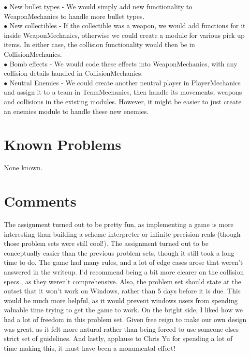 \documentclass{article}
\begin{document}
$\bullet$ New bullet types - We would simply add new functionality to WeaponMechanics to handle more bullet types.  \\
$\bullet$ New collectibles - If the collectible was a weapon, we would add functions for it inside WeaponMechanics, otherwise we could
create a module for various pick up items. In either case, the collision functionality would then be in CollisionMechanics. \\
$\bullet$ Bomb effects - We would code these effects into WeaponMechanics, with any collision details handled in CollisionMechanics. \\
$\bullet$ Neutral Enemies - We could create another neutral player in PlayerMechanics and assign it to a  team in TeamMechanics, then handle its
movements, weapons and collisions in the existing modules. However, it might be easier to just create an enemies module to handle these new enemies.

\section {Known Problems}
None known.

\section{Comments}
The assignment turned out to be pretty fun, as implementing a game is more interesting than building a scheme interpreter or infinite-precision reals (though those problem sets were still cool!). The assignment turned out to be conceptually easier than the previous problem sets, though it still took a long time to do. The game had many rules, and a lot of edge cases arose that weren't answered in the writeup. I'd recommend being a bit more clearer on the collision specs., as they weren't comprehensive. Also, the problem set should state at the outset that it won't work on Windows, rather than 5 days before it is due. This would be much more helpful, as it would prevent windows users from spending valuable time trying to get the game to work. On the bright side, I liked how we had a lot of freedom in this problem set. Given free reign to make our own design was great, as it felt more natural rather than being forced to use someone elses strict set of guidelines. And lastly, applause to Chris Yu for spending a lot of time making this, it must have been a monumental effort!
\end{document}
